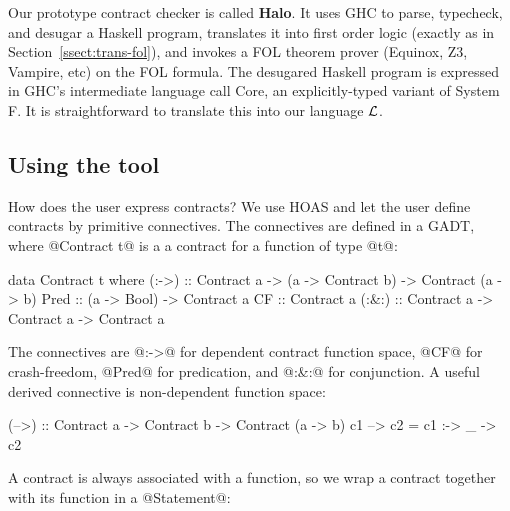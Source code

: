 Our prototype contract checker is called \textbf{Halo}.
It uses GHC to parse, typecheck, and desugar a Haskell program,
translates it into first order logic (exactly as in Section~\ref{ssect:trans-fol}), and
invokes a FOL theorem prover (Equinox, Z3, Vampire, etc) on the FOL formula.
The desugared Haskell program is expressed in GHC's intermediate language
call Core, an explicitly-typed variant of System F.  It is straightforward
to translate this into our language $\cal L$.

\subsection{Using the tool}

How does the user express contracts? We use HOAS and let the user
define contracts by primitive connectives.  The connectives are
defined in a GADT, where @Contract t@ is a a contract for a function
of type @t@:
\begin{code}
data Contract t where
  (:->) :: Contract a -> (a -> Contract b) ->
           Contract (a -> b)
  Pred  :: (a -> Bool) -> Contract a
  CF    :: Contract a
  (:&:) :: Contract a -> Contract a -> Contract a
\end{code}

The connectives are @:->@ for dependent contract function space, @CF@
for crash-freedom, @Pred@ for predication, and
@:&:@ for conjunction.
A useful derived connective is non-dependent function space:
\par {\small
\begin{code}
(-->) :: Contract a -> Contract b -> Contract (a -> b)
c1 --> c2 = c1 :-> \_ -> c2
\end{code}
} \par
%
%

A contract is always associated with a function, so we wrap a contract
together with its function in a @Statement@:


